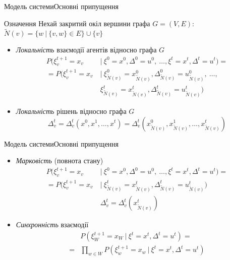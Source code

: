 \documentclass[pdf]{beamer}
\begin{document}
\begin{frame}{Модель системи}{Основні припущення}
\begin{block}{Означення}
Нехай закритий окіл вершини графа \(G = (V, E)\): \(\tilde{N}(v) = \big\{w\ |\ \{v, w\} \in E\big\} \cup \{v\}\:\)
\end{block}

	\begin{itemize}
	\item<2-> \textit{Локальність} взаємодії агентів відносно графа \(G\)
    \begin{align*}
    P(\xi_v^{t+1} = x_v\ &|\ \xi^0 = x^0, \Delta^0 = u^0,\ \ldots, \xi^t = x^t, \Delta^t = u^t) = \\
	= P(\xi_v^{t+1} = x_v\ &|\ \xi_{\tilde N(v)}^0 = x_{\tilde N(v)}^0, \Delta_{\tilde N(v)}^0 = u_{\tilde N(v)}^0,\ \ldots,\\ &\xi_{\tilde N(v)}^t = x_{\tilde N(v)}^t, \Delta_{\tilde N(v)}^t = u_{\tilde N(v)}^t)
	\end{align*}
	\item<3-> \textit{Локальність} рішень відносно графа \(G\)
	\[\Delta_v^{t} = \Delta_v^{t}(x^0, x^1, \ldots, x^t) = \Delta_v^{t}(x_{\tilde{N}(v)}^0, x_{\tilde{N}(v)}^1, \ldots, x_{\tilde{N}(v)}^t)\]
	\end{itemize}

\end{frame}


\begin{frame}{Модель системи}{Основні припущення}
\begin{itemize}[<+->]
	\item \textit{Марковість} (повнота стану)
    \begin{align*}
    P(\xi_v^{t+1} = x_v\ &|\ \xi^0 = x^0, \Delta^0 = u^0,\ \ldots, \xi^t = x^t, \Delta^t = u^t) = \\
	= P(\xi_v^{t+1} = x_v\ &|\ \xi_{\tilde N(v)}^t = x_{\tilde N(v)}^t, \Delta_{\tilde N(v)}^t = u_{\tilde N(v)}^t) \\
	&\Delta_v^{t} = \Delta_v^{t}(x_{\tilde{N}(v)}^t)
	\end{align*}
	\item \textit{Синхронність} взаємодії
	\begin{align*}
	&P(\xi^{t+1}_W = x_W\ |\ \xi^t = x^t, \Delta^t = u^t) = \\
    = &\prod_{w \in W} P(\xi^{t+1}_w = x_w\ |\ \xi^t = x^t, \Delta^t = u^t)
    \end{align*}
	\end{itemize}
\end{frame}
\end{document}
